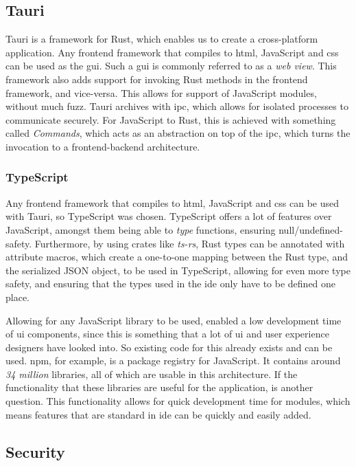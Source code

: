 \subsection{Tauri}

Tauri is a framework for Rust, which enables us to create a cross-platform
application. Any frontend framework that compiles to \gls{html}, JavaScript and
\gls{css} can be used as the \gls{gui}. Such a \gls{gui} is commonly referred to
as a \textit{web view}. This framework also adds support for invoking Rust
methods in the frontend framework, and vice-versa. This allows for support of
JavaScript modules, without much fuzz. Tauri archives with \gls{ipc}, which
allows for isolated processes to communicate securely. For JavaScript to Rust,
this is achieved with something called \textit{Commands}, which acts as an
abstraction on top of the \gls{ipc}, which turns the invocation to a
frontend-backend architecture.

\subsubsection{TypeScript}

Any frontend framework that compiles to \gls{html}, JavaScript and \gls{css} can
be used with Tauri, so TypeScript was chosen. TypeScript offers a lot of
features over JavaScript, amongst them being able to \textit{type} functions,
ensuring null/undefined-safety. Furthermore, by using crates like
\textit{ts-rs}, Rust types can be annotated with attribute macros, which create
a one-to-one mapping between the Rust type, and the serialized JSON object, to
be used in TypeScript, allowing for even more type safety, and ensuring that the
types used in the \gls{ide} only have to be defined one place.

Allowing for any JavaScript library to be used, enabled a low development time
of \gls{ui} components, since this is something that a lot of \gls{ui} and user
experience designers have looked into. So existing code for this already exists
and can be used. \gls{npm}, for example, is a package registry for JavaScript.
It contains around \textit{34 million} libraries, all of which are usable in
this architecture. If the functionality that these libraries are useful for the
application, is another question. This functionality allows for quick
development time for modules, which means features that are standard in
\gls{ide} can be quickly and easily added.

\subsection{Security}

